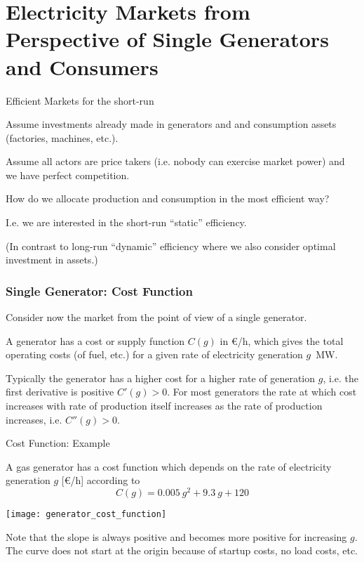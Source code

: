 \documentclass[10pt,dvipsnames]{beamer}
\begin{document}
\section{Electricity Markets from Perspective of Single Generators and Consumers}

\begin{frame}{Efficient Markets for the short-run}


  Assume investments already made in generators and and consumption assets (factories, machines, etc.).

  Assume all actors are price takers (i.e. nobody can exercise market power) and we have perfect competition.

  How do we allocate production and consumption in the most efficient way?


  I.e. we are interested in the \alert{short-run ``static'' efficiency}.

  \vspace{.7cm}

  (In contrast to \alert{long-run ``dynamic'' efficiency} where we also consider optimal investment in assets.)
\end{frame}





\begin{frame}
  \frametitle{Single Generator: Cost Function}

  Consider now the market from the point of view of a single generator.

  A generator has a \alert{cost or supply function} $C(g)$ in \euro/h,
  which gives the total operating costs (of fuel, etc.) for a given
  rate of electricity generation $g$~MW.

  Typically the generator has a higher cost for a higher rate of generation $g$,
  i.e. the first derivative is positive $C'(g) > 0$. For most generators the rate at which cost increases with rate of production itself increases as the rate of production increases, i.e. $C''(g) > 0$.

\end{frame}


\begin{frame}{Cost Function: Example}


  A gas generator has a cost function which depends on the
  rate of electricity generation $g$ [\euro/h] according to
  \begin{equation*}
    C(g) = 0.005~g^2  + 9.3~g + 120
  \end{equation*}


  \centering
  \texttt{[image: generator\_cost\_function]}

  \raggedright
  Note that the slope is always positive and becomes more positive
  for increasing $g$. The curve does not start at the origin because of startup costs, no load costs, etc.
\end{frame}
\end{document}
